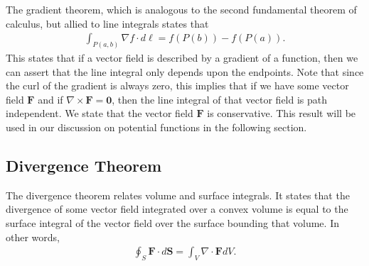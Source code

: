The gradient theorem, which is analogous to the second fundamental theorem of calculus, but allied to line integrals states that
\begin{align}
  \int_{P(a,b)} \nabla f \cdot d\boldsymbol\ell = f(P(b)) - f(P(a)) .
\end{align}
This states that if a vector field is described by a gradient of a function, then we can assert that the line integral only depends upon the endpoints. Note that since the curl of the gradient is always zero, this implies that if we have some vector field $\mathbf{F}$ and if $\nabla \times \mathbf{F} = \mathbf{0}$, then the line integral of that vector field is path independent. We state that the vector field $\mathbf{F}$ is conservative. This result will be used in our discussion on potential functions in the following section.

\subsection{Divergence Theorem}

The divergence theorem relates volume and surface integrals. It states that the divergence of some vector field integrated over a convex volume is equal to the surface integral of the vector field over the surface bounding that volume. In other words,
\begin{align}
  \oint_S \mathbf{F} \cdot d\mathbf{S} = \int_V \nabla \cdot \mathbf{F} dV.
\end{align}

